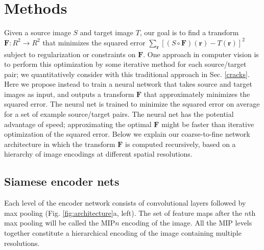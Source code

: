 \documentclass{article}
\renewcommand{\vec}[1]{\mathbf{#1}}
\begin{document}

\section{Methods}
Given a source image $S$ and target image $T$, our goal is to find a transform $\vec{F}:R^2\to R^2$ that minimizes the squared error
$\sum_\vec{r}[(S\circ\vec{F})(\vec{r})-T(\vec{r})]^2$    
subject to regularization or constraints on $\vec{F}$. One approach in computer vision is to perform this optimization by some iterative method for each source/target pair; we quantitatively consider with this traditional approach in Sec. \ref{cracks}. Here we propose instead to train a neural network that takes source and target images as input, and outputs a transform $\vec{F}$ that approximately minimizes the squared error. The neural net is trained to minimize the squared error on average for a set of example source/target pairs. The neural net has the potential advantage of speed; approximating the optimal $\vec{F}$ might be faster than iterative optimization of the squared error. Below we explain our coarse-to-fine network architecture in which the transform $\vec{F}$ is computed recursively, based on a hierarchy of image encodings at different spatial resolutions.

\subsection{Siamese encoder nets}
Each level of the encoder network consists of convolutional layers followed by max pooling (Fig. \ref{fig:architecture}a, left). The set of feature maps after the $n$th max pooling will be called the MIP$n$ encoding of the image.  All the MIP levels together constitute a hierarchical encoding of the image containing multiple resolutions. 

\end{document}
